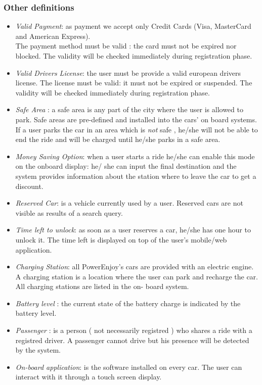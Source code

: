 \documentclass[12pt]{article}
\begin{document}
	\subsubsection{Other definitions}
	\begin{itemize}
	\item \textit{Valid Payment}: as payment we accept only Credit Cards (Visa, MasterCard and American Express).\\The payment method must be valid : the card must not be expired nor blocked. The validity will be checked immediately during registration phase.
	\item \textit{Valid Drivers License}: the user must be provide a valid european drivers license. The license must be valid: it must not be expired or suspended. The validity will be checked immediately during registration phase. 
	\item \textit{Safe Area} : a safe area is any part of the city where the user is allowed to park. Safe areas are pre-defined and installed into the cars' on board systems. If a user parks the car in an area which is \textit{not} safe , he/she will not be able to end the ride and will be charged until he/she parks in a safe area.
	\item \textit{Money Saving Option}: when a user starts a ride he/she can enable this mode on the onboard display: he/ she can input the final destination and the system provides information about the station where to leave the car to get a discount.
	\item \textit{Reserved Car}:  is a vehicle currently used by a user. Reserved cars are not visible as results of a search query.
	\item \textit{Time left to unlock}: as soon as a user reserves a car, he/she has one hour to unlock it. The time left is displayed on top of the user's mobile/web application.
	\item \textit{Charging Station}: all PowerEnjoy's cars are provided with an electric engine. A charging station is a location where the user can park and recharge the car. All charging stations are listed in the on- board system.
	\item \textit{Battery level} : the current state of the battery charge is indicated by the battery level.
	\item \textit{Passenger} : is a person ( not necessarily registred ) who shares a ride with a registred driver. A passenger cannot drive but his presence will be detected by the system. 
	\item \textit{On-board application}: is the software installed on every car. The user can interact with it through a touch screen display.

\end{itemize}
\end{document}
